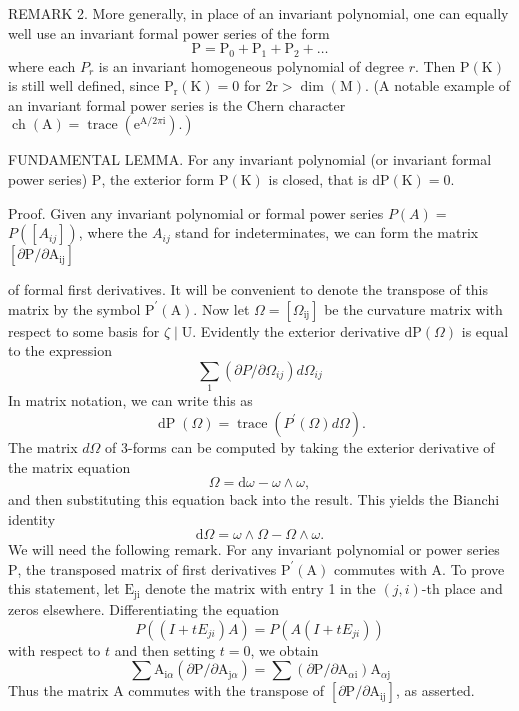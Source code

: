 \documentclass[10pt]{article}
\begin{document}
REMARK 2. More generally, in place of an invariant polynomial, one can equally well use an invariant formal power series of the form
$$
\mathrm{P}=\mathrm{P}_{0}+\mathrm{P}_{1}+\mathrm{P}_{2}+\ldots
$$
where each $P_{r}$ is an invariant homogeneous polynomial of degree $r$. Then $\mathrm{P}(\mathrm{K})$ is still well defined, since $\mathrm{P}_{\mathrm{r}}(\mathrm{K})=0$ for $2 \mathrm{r}>\operatorname{dim}(\mathrm{M})$. (A notable example of an invariant formal power series is the Chern character $\left.\operatorname{ch}(\mathrm{A})=\operatorname{trace}\left(\mathrm{e}^{\mathrm{A} / 2 \pi \mathrm{i}}\right) .\right)$

FUNDAMENTAL LEMMA. For any invariant polynomial (or invariant formal power series) $\mathrm{P}$, the exterior form $\mathrm{P}(\mathrm{K})$ is closed, that is $\mathrm{dP}(\mathrm{K})=0$.

Proof. Given any invariant polynomial or formal power series $P(A)=$ $P\left(\left[A_{i j}\right]\right)$, where the $A_{i j}$ stand for indeterminates, we can form the matrix $\left[\partial \mathrm{P} / \partial \mathrm{A}_{\mathrm{ij}}\right]$

of formal first derivatives. It will be convenient to denote the transpose of this matrix by the symbol $\mathrm{P}^{\prime}(\mathrm{A})$. Now let $\Omega=\left[\Omega_{\mathrm{ij}}\right]$ be the curvature matrix with respect to some basis for $\zeta \mid \mathrm{U}$. Evidently the exterior derivative $\mathrm{dP}(\Omega)$ is equal to the expression
$$
\sum_{1}\left(\partial P / \partial \Omega_{i j}\right) d \Omega_{i j}
$$
In matrix notation, we can write this as
$$
\operatorname{dP}(\Omega)=\operatorname{trace}\left(P^{\prime}(\Omega) d \Omega\right) .
$$
The matrix $d \Omega$ of 3-forms can be computed by taking the exterior derivative of the matrix equation
$$
\Omega=\mathrm{d} \omega-\omega \wedge \omega,
$$
and then substituting this equation back into the result. This yields the Bianchi identity
$$
\mathrm{d} \Omega=\omega \wedge \Omega-\Omega \wedge \omega .
$$
We will need the following remark. For any invariant polynomial or power series $\mathrm{P}$, the transposed matrix of first derivatives $\mathrm{P}^{\prime}(\mathrm{A})$ commutes with A. To prove this statement, let $\mathrm{E}_{\mathrm{ji}}$ denote the matrix with entry 1 in the $(j, i)$-th place and zeros elsewhere. Differentiating the equation
$$
P\left(\left(I+t E_{j i}\right) A\right)=P\left(A\left(I+t E_{j i}\right)\right)
$$
with respect to $t$ and then setting $t=0$, we obtain
$$
\sum \mathrm{A}_{\mathrm{i} \alpha}\left(\partial \mathrm{P} / \partial \mathrm{A}_{\mathrm{j} \alpha}\right)=\sum\left(\partial \mathrm{P} / \partial \mathrm{A}_{\alpha \mathrm{i}}\right) \mathrm{A}_{\alpha \mathrm{j}}
$$
Thus the matrix $\mathrm{A}$ commutes with the transpose of $\left[\partial \mathrm{P} / \partial \mathrm{A}_{\mathrm{ij}}\right]$, as asserted.
\end{document}
